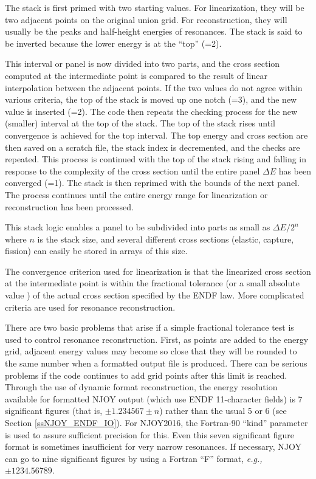 The stack is first primed with two starting values.  For
linearization, they will be two adjacent points on the original
union grid.  For reconstruction, they will usually be the peaks
and half-height energies of resonances.  The stack is said to be
inverted because the lower energy is at the ``top''
(=2).

This interval or panel is now divided into two parts, and the
cross section computed at the intermediate point is compared to
the result of linear interpolation between the adjacent points.
If the two values do not agree within various criteria, the top
of the stack is moved up one notch (=3), and the new
value is inserted (=2).  The code then repeats the
checking process for the new (smaller) interval at the top of the
stack.  The top of the stack rises until convergence is achieved
for the top interval.  The top energy and cross section are then
saved on a scratch file, the stack index is decremented, and the
checks are repeated.  This process is continued with the top of
the stack rising and falling in response to the complexity of the
cross section until the entire panel $\Delta E$ has been
converged (=1).  The stack is then reprimed with the
bounds of the next panel.  The process continues until the entire
energy range for linearization or reconstruction has been
processed.

This stack logic enables a panel to be subdivided into parts as
small as $\Delta E / 2^n$ where $n$ is the stack size, and several
different cross sections (elastic, capture, fission) can easily
be stored in arrays of this size.

The convergence criterion used for linearization is that the
linearized cross section at the intermediate point is within the
fractional tolerance  (or a small absolute value
) of the actual cross section specified by the
ENDF law. More complicated criteria are used for resonance
reconstruction.

There are two basic problems that arise if a simple fractional
tolerance test is used to control resonance reconstruction.
First, as points are added to the energy grid, adjacent energy
values may become so close that they will be rounded to the same
number when a formatted output file is produced.  There can be
serious problems if the code continues to add grid points after
this limit is reached.  Through the use of dynamic format
reconstruction, the energy resolution available for formatted
NJOY output (which use ENDF 11-character fields) is 7
significant figures (that is,
$\pm 1.234567\pm n$) rather than the usual 5 or 6 (see Section
\ref{ssNJOY_ENDF_IO}).  For NJOY2016, the Fortran-90 ``kind'' parameter is
used to assure sufficient precision for this.  Even this
seven significant figure format is sometimes insufficient for
very narrow resonances.  If necessary, NJOY can go to nine
significant figures by using a Fortran ``F'' format,
{\it e.g.,} $\pm 1234.56789$.


